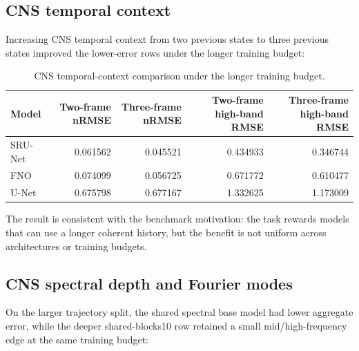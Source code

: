 \documentclass[11pt]{article}
\begin{document}
\subsection{CNS temporal context}

Increasing CNS temporal context from two previous states to three previous
states improved the lower-error rows under the longer training budget:

\begin{table}[h]
\centering
\caption{CNS temporal-context comparison under the longer training budget.}
\begin{tabular}{lrrrr}
\toprule
Model & Two-frame nRMSE & Three-frame nRMSE & Two-frame high-band RMSE & Three-frame high-band RMSE \\
\midrule
SRU-Net & 0.061562 & 0.045521 & 0.434933 & 0.346744 \\
FNO & 0.074099 & 0.056725 & 0.671772 & 0.610477 \\
U-Net & 0.675798 & 0.677167 & 1.332625 & 1.173009 \\
\bottomrule
\end{tabular}
\end{table}

The result is consistent with the benchmark motivation: the task rewards models
that can use a longer coherent history, but the benefit is not uniform across
architectures or training budgets.

\subsection{CNS spectral depth and Fourier modes}

On the larger trajectory split, the shared spectral base model had lower
aggregate error, while the deeper shared-blocks10 row retained a small
mid/high-frequency edge at the same training budget:
\end{document}

